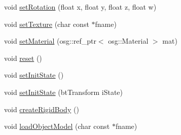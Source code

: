 \begin{DoxyCompactItemize}
void \hyperlink{classbtosgObject_a4d21ca59b944fd26644db35d3e9ba67a}{set\+Rotation} (float x, float y, float z, float w)
\item 
void \hyperlink{classbtosgObject_aff54acbc7c66811efb0cf2838107a241}{set\+Texture} (char const $\ast$fname)
\item 
void \hyperlink{classbtosgObject_a6ab7b9e0553dab398b980637788b56a8}{set\+Material} (osg\+::ref\+\_\+ptr$<$ osg\+::\+Material $>$ mat)
\item 
void \hyperlink{classbtosgObject_a93983f9180dd0672f8779cf2baa78580}{reset} ()
\item 
void \hyperlink{classbtosgObject_ad1508a0ce28cfac83e5f0ff6245f91b5}{set\+Init\+State} ()
\item 
void \hyperlink{classbtosgObject_a6ceb08e59ee95acaaef389ee198d2b56}{set\+Init\+State} (bt\+Transform i\+State)
\item 
void \hyperlink{classbtosgObject_a029dbe9134fa94e7355799f67fb2cd6d}{create\+Rigid\+Body} ()
\item 
void \hyperlink{classbtosgObject_a91838b8235579da178fcc06e6d3d47f3}{load\+Object\+Model} (char const $\ast$fname)
\end{DoxyCompactItemize}
